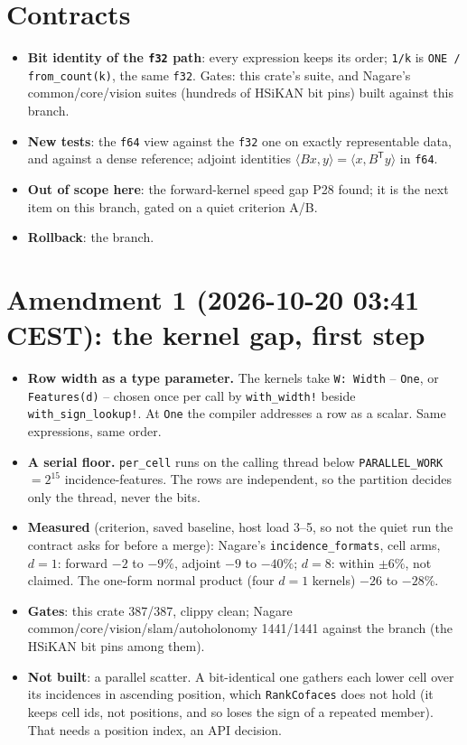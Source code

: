 \documentclass[11pt,a4paper]{article}
\begin{document}
\section{Contracts}
\begin{itemize}
\item \textbf{Bit identity of the \texttt{f32} path}: every expression keeps its order; \texttt{1/k} is
  \texttt{ONE / from\_count(k)}, the same \texttt{f32}. Gates: this crate's suite, and Nagare's common/core/vision
  suites (hundreds of HSiKAN bit pins) built against this branch.
\item \textbf{New tests}: the \texttt{f64} view against the \texttt{f32} one on exactly representable data, and
  against a dense reference; adjoint identities $\langle Bx, y\rangle = \langle x, B^{\mathsf T}y\rangle$ in
  \texttt{f64}.
\item \textbf{Out of scope here}: the forward-kernel speed gap P28 found; it is the next item on this branch, gated on
  a quiet criterion A/B.
\item \textbf{Rollback}: the branch.
\end{itemize}
\section{Amendment 1 (2026-10-20 03:41 CEST): the kernel gap, first step}
\begin{itemize}
\item \textbf{Row width as a type parameter.} The kernels take \texttt{W: Width} -- \texttt{One}, or
  \texttt{Features(d)} -- chosen once per call by \texttt{with\_width!} beside \texttt{with\_sign\_lookup!}. At
  \texttt{One} the compiler addresses a row as a scalar. Same expressions, same order.
\item \textbf{A serial floor.} \texttt{per\_cell} runs on the calling thread below \texttt{PARALLEL\_WORK} $=2^{15}$
  incidence-features. The rows are independent, so the partition decides only the thread, never the bits.
\item \textbf{Measured} (criterion, saved baseline, host load 3--5, so not the quiet run the contract asks for before a
  merge): Nagare's \texttt{incidence\_formats}, cell arms, $d=1$: forward $-2$ to $-9\%$, adjoint $-9$ to $-40\%$;
  $d=8$: within $\pm6\%$, not claimed. The one-form normal product (four $d=1$ kernels) $-26$ to $-28\%$.
\item \textbf{Gates}: this crate 387/387, clippy clean; Nagare common/core/vision/slam/autoholonomy 1441/1441 against
  the branch (the HSiKAN bit pins among them).
\item \textbf{Not built}: a parallel scatter. A bit-identical one gathers each lower cell over its incidences in
  ascending position, which \texttt{RankCofaces} does not hold (it keeps cell ids, not positions, and so loses the
  sign of a repeated member). That needs a position index, an API decision.
\end{itemize}
\end{document}
